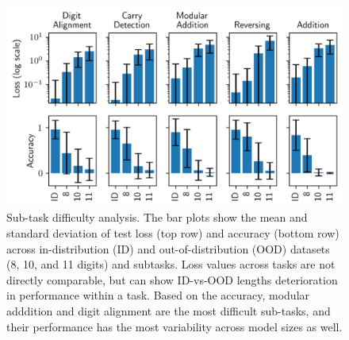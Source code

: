 \begin{figure}[h!]
    \centering
    \includegraphics[width=\textwidth]{fig/subtask_difficulty.png}
    \caption{Sub-task difficulty analysis. The bar plots show the mean and standard deviation of test loss (top row) and accuracy (bottom row) across in-distribution (ID) and out-of-distribution (OOD) datasets (8, 10, and 11 digits) and subtasks. Loss values across tasks are not directly comparable, but can show ID-vs-OOD lengths deterioration in performance within a task. Based on the accuracy, modular adddition and digit alignment are the most difficult sub-tasks, and their performance has the most variability across model sizes as well.}
    \label{fig:subtask_difficulty}
\end{figure}
